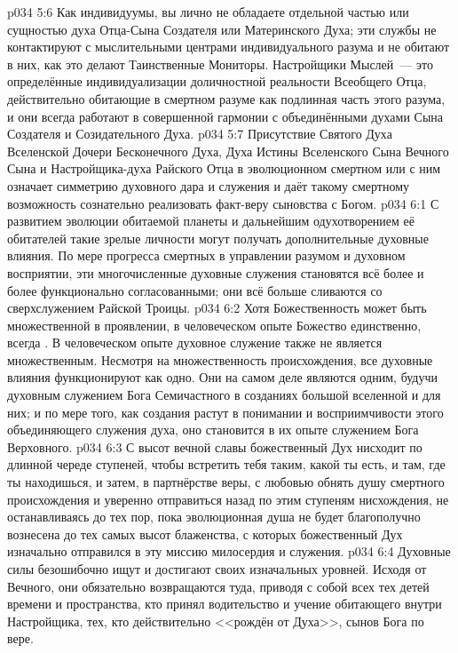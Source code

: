 \vs p034 5:6 \pc Как индивидуумы, вы лично не обладаете отдельной частью или сущностью духа Отца\hyp{}Сына Создателя или Материнского Духа; эти службы не контактируют с мыслительными центрами индивидуального разума и не обитают в них, как это делают Таинственные Мониторы. Настройщики Мыслей~--- это определённые индивидуализации доличностной реальности Всеобщего Отца, действительно обитающие в смертном разуме как подлинная часть этого разума, и они всегда работают в совершенной гармонии с объединёнными духами Сына Создателя и Созидательного Духа.
\vs p034 5:7 Присутствие Святого Духа Вселенской Дочери Бесконечного Духа, Духа Истины Вселенского Сына Вечного Сына и Настройщика\hyp{}духа Райского Отца в эволюционном смертном или с ним означает симметрию духовного дара и служения и даёт такому смертному возможность сознательно реализовать факт\hyp{}веру сыновства с Богом.
\vs p034 6:1 С развитием эволюции обитаемой планеты и дальнейшим одухотворением её обитателей такие зрелые личности могут получать дополнительные духовные влияния. По мере прогресса смертных в управлении разумом и духовном восприятии, эти многочисленные духовные служения становятся всё более и более функционально согласованными; они всё больше сливаются со сверхслужением Райской Троицы.
\vs p034 6:2 Хотя Божественность может быть множественной в проявлении, в человеческом опыте Божество единственно, всегда . В человеческом опыте духовное служение также не является множественным. Несмотря на множественность происхождения, все духовные влияния функционируют как одно. Они на самом деле являются одним, будучи духовным служением Бога Семичастного в созданиях большой вселенной и для них; и по мере того, как создания растут в понимании и восприимчивости этого объединяющего служения духа, оно становится в их опыте служением Бога Верховного.
\vs p034 6:3 \pc С высот вечной славы божественный Дух нисходит по длинной череде ступеней, чтобы встретить тебя таким, какой ты есть, и там, где ты находишься, и затем, в партнёрстве веры, с любовью обнять душу смертного происхождения и уверенно отправиться назад по этим ступеням нисхождения, не останавливаясь до тех пор, пока эволюционная душа не будет благополучно вознесена до тех самых высот блаженства, с которых божественный Дух изначально отправился в эту миссию милосердия и служения.
\vs p034 6:4 Духовные силы безошибочно ищут и достигают своих изначальных уровней. Исходя от Вечного, они обязательно возвращаются туда, приводя с собой всех тех детей времени и пространства, кто принял водительство и учение обитающего внутри Настройщика, тех, кто действительно <<рождён от Духа>>, сынов Бога по вере.
